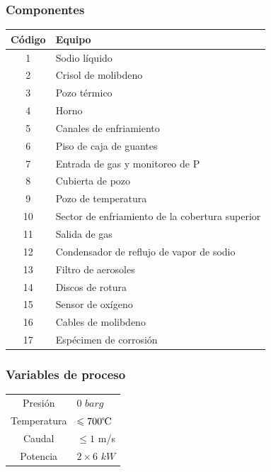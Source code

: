 \documentclass{article}
\begin{document}
\subsubsection*{Componentes}
\begin{table}[H]
\centering
\begin{tabular}{cp{4cm}}
\toprule
Código & Equipo \\
\midrule
1 & Sodio líquido \\
2 & Crisol de molibdeno \\
3 & Pozo térmico \\
4 & Horno \\
5 & Canales de \newline enfriamiento \\
6 & Piso de caja de guantes \\
7 & Entrada de gas y \newline monitoreo de P \\
8 & Cubierta de pozo \\
9 & Pozo de temperatura \\
10 & Sector de enfriamiento de la cobertura superior \\
11 & Salida de gas \\
12 & Condensador de reflujo de vapor de sodio \\
13 & Filtro de aerosoles \\
14 & Discos de rotura \\
15 & Sensor de oxígeno \\
16 & Cables de molibdeno \\
17 & Espécimen de \newline corrosión \\
\bottomrule
\end{tabular}
\end{table}
\subsubsection*{Variables de proceso}
\begin{table}[H]
\centering
\begin{tabular}{cp{3.5cm}}
\toprule
Presión & 0 $barg$ \\
Temperatura & $\leqslant700\celsius$ \\
Caudal & $\leqslant 1$ m/s \\
Potencia & $2\times6$ $kW$ \\
\bottomrule
\end{tabular}
\end{table}
\end{document}
